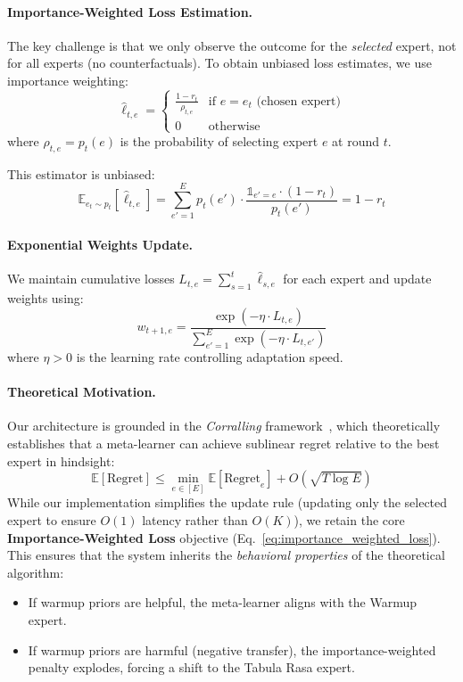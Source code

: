 \paragraph{Importance-Weighted Loss Estimation.}
The key challenge is that we only observe the outcome for the \emph{selected} expert, not for all experts (no counterfactuals).
To obtain unbiased loss estimates, we use importance weighting:
\begin{equation}
\hat{\ell}_{t,e} = \begin{cases}
\frac{1 - r_t}{\rho_{t,e}} & \text{if } e = e_t \text{ (chosen expert)} \\
0 & \text{otherwise}
\end{cases}
\label{eq:importance_weighted_loss}
\end{equation}
where $\rho_{t,e} = p_t(e)$ is the probability of selecting expert $e$ at round $t$.

This estimator is unbiased:
\begin{equation}
\mathbb{E}_{e_t \sim p_t}[\hat{\ell}_{t,e}] 
= \sum_{e'=1}^{E} p_t(e') \cdot \frac{\mathbb{1}_{e'=e} \cdot (1-r_t)}{p_t(e')} 
= 1 - r_t
\end{equation}

\paragraph{Exponential Weights Update.}
We maintain cumulative losses $L_{t,e} = \sum_{s=1}^{t} \hat{\ell}_{s,e}$ for each expert and update weights using:
\begin{equation}
w_{t+1,e} = \frac{\exp(-\eta \cdot L_{t,e})}{\sum_{e'=1}^{E} \exp(-\eta \cdot L_{t,e'})}
\label{eq:exponential_weights}
\end{equation}
where $\eta > 0$ is the learning rate controlling adaptation speed.

\paragraph{Theoretical Motivation.}
Our architecture is grounded in the \emph{Corralling} framework~\cite{agarwal2017corralling}, which theoretically establishes that a meta-learner can achieve sublinear regret relative to the best expert in hindsight:
\begin{equation}
\mathbb{E}[\text{Regret}] \leq \min_{e \in [E]} \mathbb{E}[\text{Regret}_e] + O\left(\sqrt{T \log E}\right)
\end{equation}
While our implementation simplifies the update rule (updating only the selected expert to ensure $O(1)$ latency rather than $O(K)$), we retain the core \textbf{Importance-Weighted Loss} objective (Eq.~\ref{eq:importance_weighted_loss}).
This ensures that the system inherits the \emph{behavioral properties} of the theoretical algorithm:
\begin{itemize}[nosep]
    \item If warmup priors are helpful, the meta-learner aligns with the Warmup expert.
    \item If warmup priors are harmful (negative transfer), the importance-weighted penalty explodes, forcing a shift to the Tabula Rasa expert.
\end{itemize}

